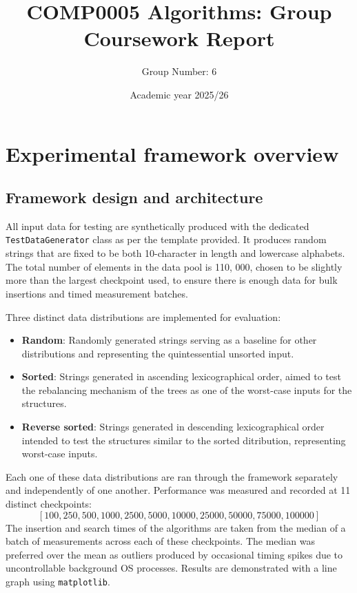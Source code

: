 \documentclass[12pt]{article}
\begin{document}
\title{COMP0005 Algorithms: Group Coursework Report}
\author{Group Number: 6}
\date{Academic year 2025/26}
\maketitle



\section{Experimental framework overview}

\subsection{Framework design and architecture}

\label{sec:framework}
 
All input data for testing are synthetically produced with the dedicated \texttt{TestDataGenerator} class as per the template provided. It produces random strings that are fixed to be both 10-character in length and lowercase alphabets. The total number of elements in the data pool is 110, 000, chosen to be slightly more than the largest checkpoint used, to ensure there is enough data for bulk insertions and timed measurement batches.

Three distinct data distributions are implemented for evaluation:

\begin{itemize}
    \item \textbf{Random}: Randomly generated strings serving as a baseline for other distributions and representing the quintessential unsorted input.
 
    \item \textbf{Sorted}: Strings generated in ascending lexicographical order, aimed to test the rebalancing mechanism of the trees as one of the worst-case inputs for the structures.
 
    \item \textbf{Reverse sorted}: Strings generated in descending lexicographical order intended to test the structures similar to the sorted ditribution, representing worst-case inputs.
\end{itemize}
Each one of these data distributions are ran through the framework separately and independently of one another.
Performance was measured and recorded at 11 distinct checkpoints:
\[
    [100, 250, 500, 1000, 2500, 5000, 10000, 25000, 50000, 75000, 100000]
\]
The insertion and search times of the algorithms are taken from the median of a batch of measurements across each of these checkpoints. The median was preferred over the mean as outliers produced by occasional timing spikes due to uncontrollable background OS processes. Results are demonstrated with a line graph using \texttt{matplotlib}.
\end{document}
